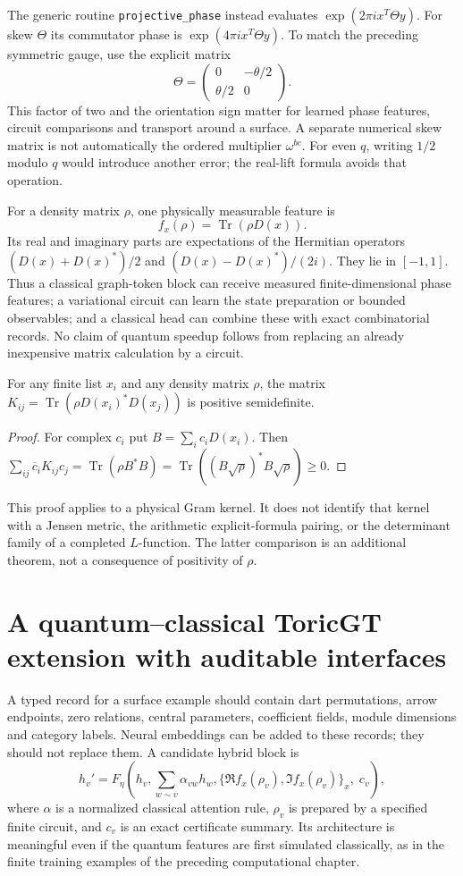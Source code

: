 The generic routine \texttt{projective\_phase} instead evaluates
$\exp(2\pi i x^T\Theta y)$. For skew $\Theta$ its commutator phase
is $\exp(4\pi i x^T\Theta y)$. To match the preceding symmetric gauge,
use the explicit matrix
\[
 \Theta=\begin{pmatrix}0&-\theta/2\\\theta/2&0\end{pmatrix}.
\]
This factor of two and the orientation sign matter for learned phase
features, circuit comparisons and transport around a surface. A separate
numerical skew matrix is not automatically the ordered multiplier
$\omega^{bc}$. For even $q$, writing $1/2$ modulo $q$ would introduce
another error; the real-lift formula avoids that operation.

For a density matrix $\rho$, one physically measurable feature is
\[
 f_x(\rho)=\operatorname{Tr}(\rho D(x)).
\]
Its real and imaginary parts are expectations of the Hermitian operators
$(D(x)+D(x)^*)/2$ and $(D(x)-D(x)^*)/(2i)$. They lie in $[-1,1]$.
Thus a classical graph-token block can receive measured finite-dimensional
phase features; a variational circuit can learn the state preparation or
bounded observables; and a classical head can combine these with exact
combinatorial records. No claim of quantum speedup follows from replacing
an already inexpensive matrix calculation by a circuit.

\begin{proposition}\label{tg:kernel}
For any finite list $x_i$ and any density matrix $\rho$, the matrix
$K_{ij}=\operatorname{Tr}(\rho D(x_i)^*D(x_j))$ is positive semidefinite.
\end{proposition}
\begin{proof}
For complex $c_i$ put $B=\sum_i c_iD(x_i)$. Then
$\sum_{ij}\overline c_iK_{ij}c_j=\operatorname{Tr}(\rho B^*B)
=\operatorname{Tr}((B\sqrt\rho)^*B\sqrt\rho)\geq0$.
\end{proof}
This proof applies to a physical Gram kernel. It does not identify that
kernel with a Jensen metric, the arithmetic explicit-formula pairing, or
the determinant family of a completed $L$-function. The latter comparison
is an additional theorem, not a consequence of positivity of $\rho$.

\section{A quantum--classical ToricGT extension with auditable interfaces}
A typed record for a surface example should contain dart permutations,
arrow endpoints, zero relations, central parameters, coefficient fields,
module dimensions and category labels. Neural embeddings can be added to
these records; they should not replace them. A candidate hybrid block is
\[
 h_v' = F_\eta\!\left(h_v,\sum_{w\sim v}\alpha_{vw}h_w,
      \{\Re f_x(\rho_v),\Im f_x(\rho_v)\}_x,\;c_v\right),
\]
where $\alpha$ is a normalized classical attention rule, $\rho_v$ is
prepared by a specified finite circuit, and $c_v$ is an exact certificate
summary. Its architecture is meaningful even if the quantum features are
first simulated classically, as in the finite training examples of the
preceding computational chapter.

